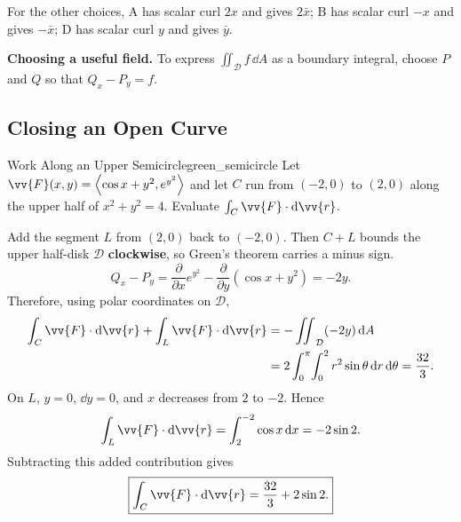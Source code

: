 For the other choices, A has scalar curl $2x$ and gives $2\bar{x}$; B has scalar curl $-x$ and gives $-\bar{x}$; D has scalar curl $y$ and gives $\bar{y}$.

\textbf{Choosing a useful field.} To express $\iint_{\mathcal{D}}f\,\dd{A}$ as a boundary integral, choose $P$ and $Q$ so that $Q_x - P_y = f$.

\newpage
\subsection{Closing an Open Curve}

\begin{problem}{Work Along an Upper Semicircle}{green_semicircle}
Let $\vv{F}(x,y) = \ang{\cos x + y^2,e^{y^2}}$ and let $C$ run from $(-2,0)$ to $(2,0)$ along the upper half of $x^2 + y^2 = 4$. Evaluate $\int_C\vv{F}\cdot\dd{\vv{r}}$.
\end{problem}
\begin{sol}
Add the segment $L$ from $(2,0)$ back to $(-2,0)$. Then $C + L$ bounds the upper half-disk $\mathcal{D}$ \textbf{clockwise}, so Green's theorem carries a minus sign.
\[
    Q_x - P_y = \frac{\partial}{\partial x}e^{y^2}
    - \frac{\partial}{\partial y}(\cos x + y^2) = -2y.
\]
Therefore, using polar coordinates on $\mathcal{D}$,
\begin{align*}
    \int_C\vv{F}\cdot\dd{\vv{r}} + \int_L\vv{F}\cdot\dd{\vv{r}}
    &= -\iint_{\mathcal{D}}(-2y)\,\dd{A}\\
    &= 2\int_0^{\pi}\!\int_0^2 r^2\sin\theta\,\dd{r}\,\dd{\theta}
     = \frac{32}{3}.
\end{align*}
On $L$, $y = 0$, $\dd{y} = 0$, and $x$ decreases from $2$ to $-2$. Hence
\[
    \int_L\vv{F}\cdot\dd{\vv{r}} = \int_2^{-2}\cos x\,\dd{x} = -2\sin 2.
\]
Subtracting this added contribution gives
\[
    \boxed{\int_C\vv{F}\cdot\dd{\vv{r}} = \frac{32}{3} + 2\sin 2.}
\]
\end{sol}

\begin{center}
\end{center}

